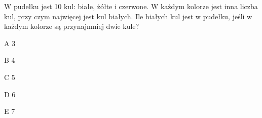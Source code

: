 \begin{tresc}
W pudełku jest 10 kul: białe, żółte i czerwone. W każdym kolorze jest inna liczba kul, przy czym najwięcej jest kul białych. Ile białych kul jest w pudełku, jeśli w każdym kolorze są przynajmniej dwie kule?
\end{tresc}
\begin{wariant}{A} 3 \end{wariant}
\begin{wariant}{B} 4 \end{wariant}
\begin{wariant}{C} 5 \end{wariant}
\begin{wariant}{D} 6 \end{wariant}
\begin{wariant}{E} 7 \end{wariant}
